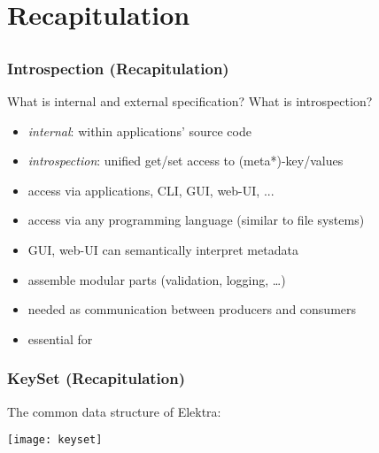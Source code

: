 \section{Recapitulation}

\subsection{}

\begin{frame}
	\frametitle{Introspection (Recapitulation)}
	\begin{task}
	What is internal and external specification?
	What is introspection?
	\end{task}

	\pause
	\vspace{1em}

	\begin{itemize}
	\item \textit{internal}: within applications' source code
	\item \textit{introspection}: unified get/set access to (meta*)-key/values
	\item access via applications, CLI, GUI, web-UI, ...
	\item access via any programming language (similar to file systems)
	\item GUI, web-UI can semantically interpret metadata
	\item assemble modular parts (validation, logging, \dots)
	\item needed as communication between producers and consumers
	\item essential for ~\citet{holland2001nofutz}
	\end{itemize}
\end{frame}

\begin{frame}
	\frametitle{KeySet (Recapitulation)}

	The common data structure of Elektra:
	\vspace{1cm}

	\texttt{[image: keyset]}
\end{frame}


